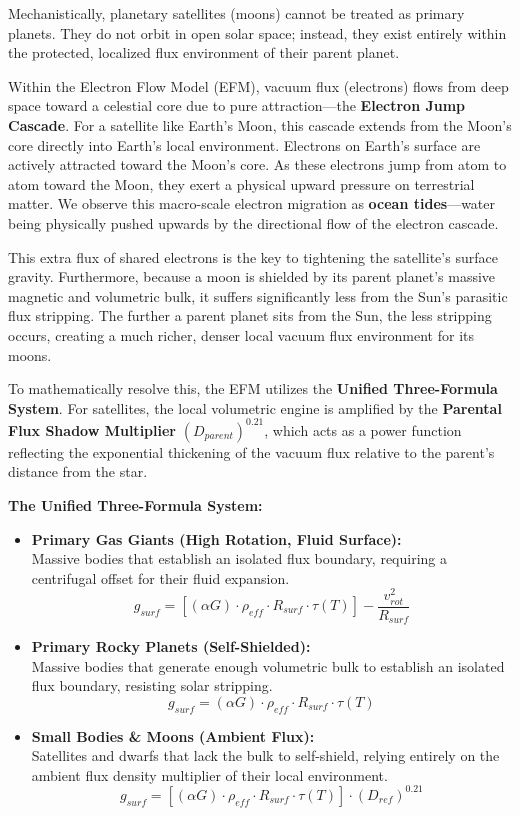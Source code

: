 \documentclass[11pt, a4paper]{article}
\begin{document}
Mechanistically, planetary satellites (moons) cannot be treated as primary planets. They do not orbit in open solar space; instead, they exist entirely within the protected, localized flux environment of their parent planet. 

Within the Electron Flow Model (EFM), vacuum flux (electrons) flows from deep space toward a celestial core due to pure attraction—the \textbf{Electron Jump Cascade}. For a satellite like Earth's Moon, this cascade extends from the Moon's core directly into Earth's local environment. Electrons on Earth's surface are actively attracted toward the Moon's core. As these electrons jump from atom to atom toward the Moon, they exert a physical upward pressure on terrestrial matter. We observe this macro-scale electron migration as \textbf{ocean tides}—water being physically pushed upwards by the directional flow of the electron cascade.

This extra flux of shared electrons is the key to tightening the satellite's surface gravity. Furthermore, because a moon is shielded by its parent planet's massive magnetic and volumetric bulk, it suffers significantly less from the Sun's parasitic flux stripping. The further a parent planet sits from the Sun, the less stripping occurs, creating a much richer, denser local vacuum flux environment for its moons.

To mathematically resolve this, the EFM utilizes the \textbf{Unified Three-Formula System}. For satellites, the local volumetric engine is amplified by the \textbf{Parental Flux Shadow Multiplier} $(D_{parent})^{0.21}$, which acts as a power function reflecting the exponential thickening of the vacuum flux relative to the parent's distance from the star.

\vspace{1.0em}
\noindent \textbf{The Unified Three-Formula System:}
\begin{itemize}
    \item \textbf{Primary Gas Giants (High Rotation, Fluid Surface):}
    \\Massive bodies that establish an isolated flux boundary, requiring a centrifugal offset for their fluid expansion.
    $$g_{surf} = \left[ (\alpha G) \cdot \rho_{eff} \cdot R_{surf} \cdot \tau(T) \right] - \frac{v_{rot}^2}{R_{surf}}$$

    \item \textbf{Primary Rocky Planets (Self-Shielded):}
    \\Massive bodies that generate enough volumetric bulk to establish an isolated flux boundary, resisting solar stripping.
    $$g_{surf} = (\alpha G) \cdot \rho_{eff} \cdot R_{surf} \cdot \tau(T)$$

    \item \textbf{Small Bodies \& Moons (Ambient Flux):}
    \\Satellites and dwarfs that lack the bulk to self-shield, relying entirely on the ambient flux density multiplier of their local environment.
    $$g_{surf} = \left[ (\alpha G) \cdot \rho_{eff} \cdot R_{surf} \cdot \tau(T) \right] \cdot (D_{ref})^{0.21}$$
\end{itemize}
\end{document}
